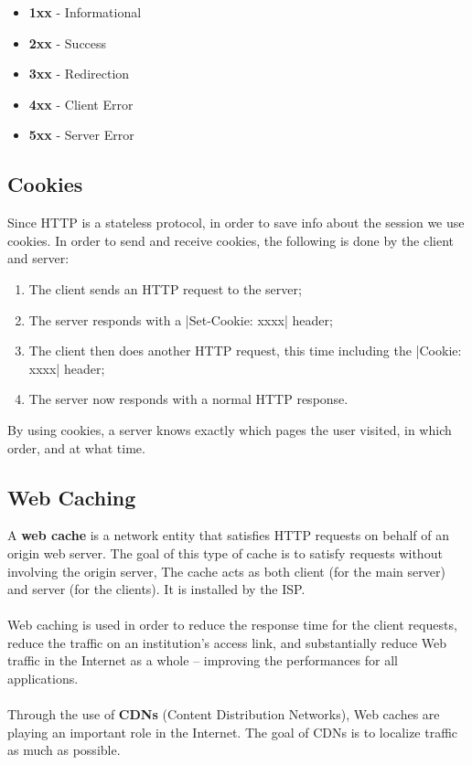 \documentclass{article}
\begin{document}
\begin{itemize}
	\item \textbf{1xx} - Informational
	\item \textbf{2xx} - Success
	\item \textbf{3xx} - Redirection
	\item \textbf{4xx} - Client Error
	\item \textbf{5xx} - Server Error
\end{itemize}

\subsection{Cookies}
Since HTTP is a stateless protocol, in order to save info about the session we use cookies. In order to send and receive cookies, the following is done by the client and server:

\begin{enumerate}
	\item The client sends an HTTP request to the server;
	\item The server responds with a \cverb|Set-Cookie: xxxx| header;
	\item The client then does another HTTP request, this time including the \cverb|Cookie: xxxx| header;
	\item The server now responds with a normal HTTP response.
\end{enumerate}
By using cookies, a server knows exactly which pages the user visited, in which order, and at what time.

\subsection{Web Caching}
A \textbf{web cache} is a network entity that satisfies HTTP requests on behalf of an origin web server. The goal of this type of cache is to satisfy requests without involving the origin server, The cache acts as both client (for the main server) and server (for the clients). It is installed by the ISP. \\ \\
Web caching is used in order to reduce the response time for the client requests, reduce the traffic on an institution's access link, and substantially reduce Web traffic in the Internet as a whole -- improving the performances for all applications. \\ \\
Through the use of \textbf{CDNs} (Content Distribution Networks), Web caches are playing an important role in the Internet. The goal of CDNs is to localize traffic as much as possible.
\end{document}
